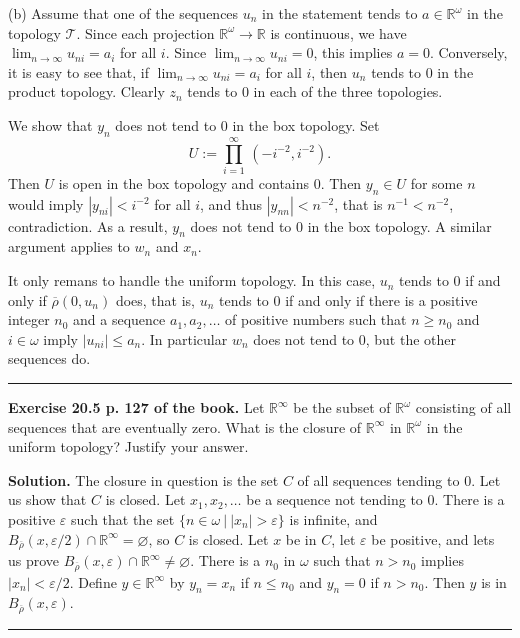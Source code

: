 \documentclass[12pt,letterpaper]{article}
\newcommand{\eps}{\varepsilon}
\newcommand{\noi}{\noindent}%
\newcommand{\R}{\mathbb R}
\newcommand{\T}{\mathcal T}
\begin{document}
\noi(b) Assume that one of the sequences $u_n$ in the statement tends to $a\in\R^\omega$ in the topology $\T$. Since each projection $\R^\omega\to\R$ is continuous, we have $\lim_{n\to\infty}u_{ni}=a_i$ for all $i$. Since $\lim_{n\to\infty}u_{ni}=0$, this implies $a=0$. Conversely, it is easy to see that, if $\lim_{n\to\infty}u_{ni}=a_i$ for all $i$, then $u_n$ tends to 0 in the product topology. Clearly $z_n$ tends to 0 in each of the three topologies. 

We show that $y_n$ does not tend to 0 in the box topology. Set 
$$
U:=\prod_{i=1}^\infty\,(-i^{-2},i^{-2}). 
$$ 
Then $U$ is open in the box topology and contains 0. Then $y_n\in U$ for some $n$ would imply $|y_{ni}|<i^{-2}$ for all $i$, and thus $|y_{nn}|<n^{-2}$, that is $n^{-1}<n^{-2}$, contradiction. As a result, $y_n$ does not tend to 0 in the box topology. A similar argument applies to $w_n$ and $x_n$. 

It only remans to handle the uniform topology. In this case, $u_n$ tends to 0 if and only if $\overline\rho(0,u_n)$ does, that is, $u_n$ tends to 0 if and only if there is a positive integer $n_0$ and a sequence $a_1,a_2,\ldots$ of positive numbers such that $n\ge n_0$ and $i\in\omega$ imply $|u_{ni}|\le a_n$. In particular $w_n$ does not tend to 0, but the other sequences do. 

\bigskip\hrule\bigskip

\noi\textbf{Exercise 20.5 p. 127 of the book.} Let $\mathbb{R}^{\infty}$ be the subset of $\mathbb{R}^{\omega}$ consisting of all sequences that are eventually zero. What is the closure of $\mathbb{R}^{\infty}$ in $\mathbb{R}^{\omega}$ in the uniform topology? Justify your answer.

\noi\textbf{Solution.} The closure in question is the set $C$ of all sequences tending to 0. Let us show that $C$ is closed. Let $x_1,x_2,\ldots$ be a sequence not tending to 0. There is a positive $\eps$ such that the set $\{n\in\omega\ |\ |x_n|>\eps\}$ is infinite, and $B_{\overline\rho}(x,\eps/2)\cap\R^\infty=\varnothing$, so $C$ is closed. Let $x$ be in $C$, let $\eps$ be positive, and lets us prove $B_{\overline\rho}(x,\eps)\cap\R^\infty\ne\varnothing$. There is a $n_0$ in $\omega$ such that $n>n_0$ implies $|x_n|<\eps/2$. Define $y\in\R^\infty$ by $y_n=x_n$ if $n\le n_0$ and $y_n=0$ if $n>n_0$. Then $y$ is in $B_{\overline\rho}(x,\eps)$. 

\bigskip\bigskip\hrule\bigskip
\end{document}
